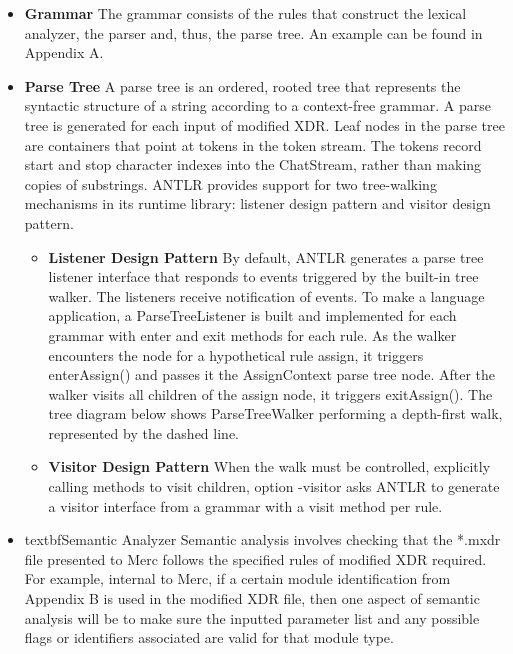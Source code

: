 \begin{itemize}
\item \textbf{Grammar} The grammar consists of the rules that construct the lexical analyzer,
  the parser and, thus, the parse tree. An example can be found in Appendix A.

\item \textbf{Parse Tree} A parse tree is an ordered, rooted tree that represents the syntactic
  structure of a string according to a context-free grammar. A parse tree is generated for each
  input of modified XDR. Leaf nodes in the parse tree are containers that point at tokens in the
  token stream. The tokens record start and stop character indexes into the ChatStream, rather
  than making copies of substrings. ANTLR provides support for two tree-walking mechanisms in
  its runtime library: listener design pattern and visitor design pattern.
  
  \begin{itemize}
  \item \textbf{Listener Design Pattern} By default, ANTLR generates a parse tree listener
    interface that responds to events triggered by the built-in tree walker. The listeners
    receive notification of events. To make a language application, a ParseTreeListener is built
    and implemented for each grammar with enter and exit methods for each rule. As the walker
    encounters the node for a hypothetical rule assign, it triggers enterAssign() and passes it
    the AssignContext parse tree node. After the walker visits all children of the assign node,
    it triggers exitAssign(). The tree diagram below shows ParseTreeWalker performing a
    depth-first walk, represented by the dashed line.

  \item \textbf{Visitor Design Pattern} When the walk must be controlled, explicitly calling
    methods to visit children, option -visitor asks ANTLR to generate a visitor interface from a
    grammar with a visit method per rule.
  \end{itemize}

\item textbf{Semantic Analyzer} Semantic analysis involves checking that the *.mxdr file
  presented to Merc follows the specified rules of modified XDR required. For example,
  internal to Merc, if a certain module identification from Appendix B is used in the
  modified XDR file, then one aspect of semantic analysis will be to make sure the inputted
  parameter list and any possible flags or identifiers associated are valid for that module
  type.


\end{itemize}
